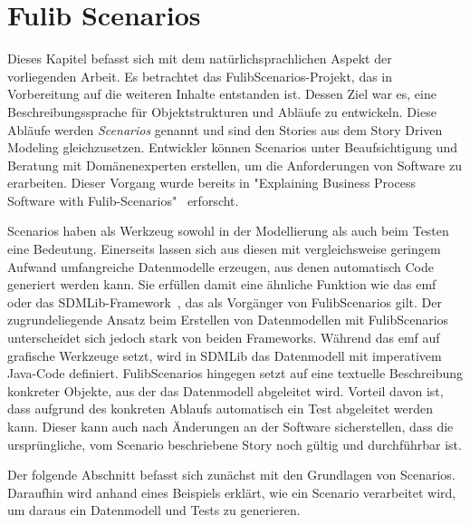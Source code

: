 \chapter{Fulib Scenarios}\label{ch:fulib-scenarios}

Dieses Kapitel befasst sich mit dem natürlichsprachlichen Aspekt der vorliegenden Arbeit.
Es betrachtet das FulibScenarios-Projekt, das in Vorbereitung auf die weiteren Inhalte entstanden ist.
Dessen Ziel war es, eine Beschreibungssprache für Objektstrukturen und Abläufe zu entwickeln.
Diese Abläufe werden \emph{Scenarios} genannt und sind den Stories aus dem Story Driven Modeling gleichzusetzen.
Entwickler können Scenarios unter Beaufsichtigung und Beratung mit Domänenexperten erstellen, um die Anforderungen von Software zu erarbeiten.
Dieser Vorgang wurde bereits in "Explaining Business Process Software with Fulib-Scenarios"~\cite{explain} erforscht.

Scenarios haben als Werkzeug sowohl in der Modellierung als auch beim Testen eine Bedeutung.
Einerseits lassen sich aus diesen mit vergleichsweise geringem Aufwand umfangreiche Datenmodelle erzeugen, aus denen automatisch Code generiert werden kann.
Sie erfüllen damit eine ähnliche Funktion wie das \ac{emf}~\cite{emf} oder das SDMLib-Framework~\cite{networkparser}, das als Vorgänger von FulibScenarios gilt.
Der zugrundeliegende Ansatz beim Erstellen von Datenmodellen mit FulibScenarios unterscheidet sich jedoch stark von beiden Frameworks.
Während das \ac{emf} auf grafische Werkzeuge setzt, wird in SDMLib das Datenmodell mit imperativem Java-Code definiert.
FulibScenarios hingegen setzt auf eine textuelle Beschreibung konkreter Objekte, aus der das Datenmodell abgeleitet wird.
Vorteil davon ist, dass aufgrund des konkreten Ablaufs automatisch ein Test abgeleitet werden kann.
Dieser kann auch nach Änderungen an der Software sicherstellen, dass die ursprüngliche, vom Scenario beschriebene Story noch gültig und durchführbar ist.

Der folgende Abschnitt befasst sich zunächst mit den Grundlagen von Scenarios.
Daraufhin wird anhand eines Beispiels erklärt, wie ein Scenario verarbeitet wird, um daraus ein Datenmodell und Tests zu generieren.



